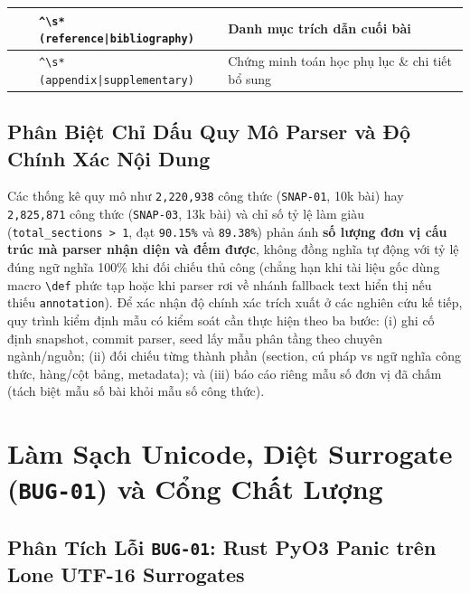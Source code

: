 \begin{table}[htbp]
\begin{tabularx}{\linewidth}{|>{\centering\arraybackslash}p{7mm}|>{\raggedright\arraybackslash}p{23mm}|>{\raggedright\arraybackslash}p{68mm}|L|}
     &  & \texttt{\^{}\textbackslash s*(reference|\allowbreak bibliography)} & Danh mục trích dẫn cuối bài \\
     &  & \texttt{\^{}\textbackslash s*(appendix|\allowbreak supplementary)} & Chứng minh toán học phụ lục \& chi tiết bổ sung \\
    \hline
  \end{tabularx}
\end{table}

\subsection{Phân Biệt Chỉ Dấu Quy Mô Parser và Độ Chính Xác Nội Dung}
\label{sec:ch2_extraction_quality}

Các thống kê quy mô như \texttt{2,220,938} công thức (\texttt{SNAP-01}, 10k bài) hay \texttt{2,825,871} công thức (\texttt{SNAP-03}, 13k bài) và chỉ số tỷ lệ làm giàu (\texttt{total\_sections > 1}, đạt \texttt{90.15\%} và \texttt{89.38\%}) phản ánh \textbf{số lượng đơn vị cấu trúc mà parser nhận diện và đếm được}, không đồng nghĩa tự động với tỷ lệ đúng ngữ nghĩa 100\% khi đối chiếu thủ công (chẳng hạn khi tài liệu gốc dùng macro \texttt{\textbackslash def} phức tạp hoặc khi parser rơi về nhánh fallback text hiển thị nếu thiếu \texttt{annotation}). Để xác nhận độ chính xác trích xuất ở các nghiên cứu kế tiếp, quy trình kiểm định mẫu có kiểm soát cần thực hiện theo ba bước: (i) ghi cố định snapshot, commit parser, seed lấy mẫu phân tầng theo chuyên ngành/nguồn; (ii) đối chiếu từng thành phần (section, cú pháp vs ngữ nghĩa công thức, hàng/cột bảng, metadata); và (iii) báo cáo riêng mẫu số đơn vị đã chấm (tách biệt mẫu số bài khỏi mẫu số công thức).

\section{Làm Sạch Unicode, Diệt Surrogate (\texttt{BUG-01}) và Cổng Chất Lượng}
\label{sec:ch2_clean_gates}

\subsection{Phân Tích Lỗi \texttt{BUG-01}: Rust PyO3 Panic trên Lone UTF-16 Surrogates}
\label{sec:ch2_bug01}

